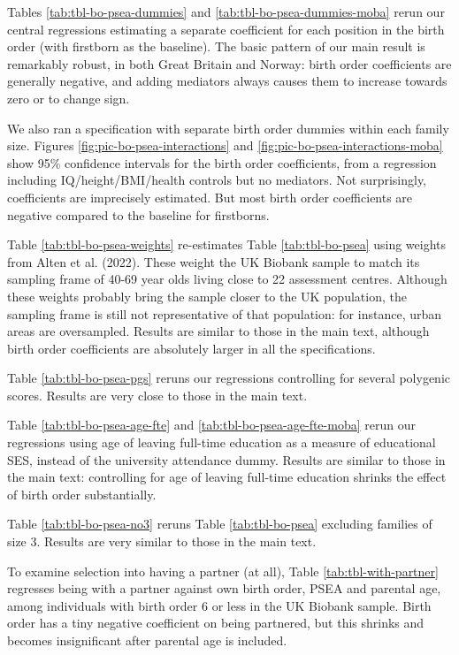 \documentclass[
  12pt,
]{article}
\theoremstyle{definition}
\theoremstyle{definition}
\theoremstyle{definition}
\theoremstyle{definition}
\theoremstyle{remark}
\begin{document}
Tables \ref{tab:tbl-bo-psea-dummies} and
\ref{tab:tbl-bo-psea-dummies-moba} rerun our central regressions
estimating a separate coefficient for each position in the birth order
(with firstborn as the baseline). The basic pattern of our main result
is remarkably robust, in both Great Britain and Norway: birth order
coefficients are generally negative, and adding mediators always causes
them to increase towards zero or to change sign.

We also ran a specification with separate birth order dummies within
each family size. Figures \ref{fig:pic-bo-psea-interactions} and
\ref{fig:pic-bo-psea-interactions-moba} show 95\% confidence intervals
for the birth order coefficients, from a regression including
IQ/height/BMI/health controls but no mediators. Not surprisingly,
coefficients are imprecisely estimated. But most birth order
coefficients are negative compared to the baseline for firstborns.

Table \ref{tab:tbl-bo-psea-weights} re-estimates Table
\ref{tab:tbl-bo-psea} using weights from Alten et al. (2022).
These weight the UK Biobank sample to match its sampling frame of 40-69
year olds living close to 22 assessment centres. Although these weights
probably bring the sample closer to the UK population, the sampling
frame is still not representative of that population: for instance,
urban areas are oversampled. Results are similar to those in the main
text, although birth order coefficients are absolutely larger in all the
specifications.

Table \ref{tab:tbl-bo-psea-pgs} reruns our regressions controlling for
several polygenic scores. Results are very close to those in the main
text.

Table \ref{tab:tbl-bo-psea-age-fte} and
\ref{tab:tbl-bo-psea-age-fte-moba} rerun our regressions using age of
leaving full-time education as a measure of educational SES, instead of
the university attendance dummy. Results are similar to those in the
main text: controlling for age of leaving full-time education shrinks
the effect of birth order substantially.

Table \ref{tab:tbl-bo-psea-no3} reruns Table \ref{tab:tbl-bo-psea}
excluding families of size 3. Results are very similar to those in the
main text.

To examine selection into having a partner (at all), Table
\ref{tab:tbl-with-partner} regresses being with a partner against own
birth order, PSEA and parental age, among individuals with birth order 6
or less in the UK Biobank sample. Birth order has a tiny negative
coefficient on being partnered, but this shrinks and becomes
insignificant after parental age is included.
\end{document}
